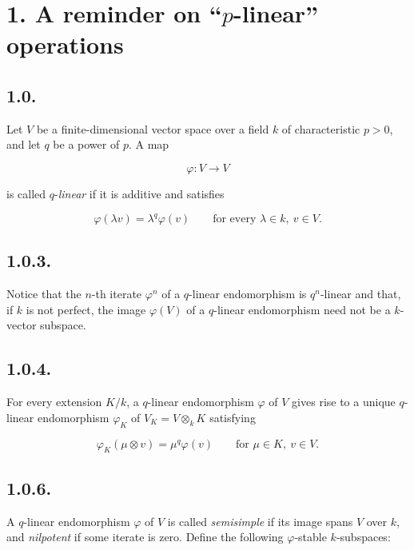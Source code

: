 \section*{1. A reminder on ``$p$-linear'' operations}

\subsection*{1.0.}
Let $V$ be a finite-dimensional vector space over a field $k$ of
characteristic $p>0$, and let $q$ be a power of $p$. A map

\begin{equation}\tag{1.0.1}
\varphi:V\longrightarrow V
\end{equation}

is called $q$-\emph{linear} if it is additive and satisfies

\begin{equation}\tag{1.0.2}
\varphi(\lambda v)=\lambda^q\varphi(v)
\qquad\text{for every }\lambda\in k,\ v\in V.
\end{equation}

\subsection*{1.0.3.}
Notice that the $n$-th iterate $\varphi^n$ of a $q$-linear endomorphism is
$q^n$-linear and that, if $k$ is not perfect, the image $\varphi(V)$ of a
$q$-linear endomorphism need not be a $k$-vector subspace.

\subsection*{1.0.4.}
For every extension $K/k$, a $q$-linear endomorphism $\varphi$ of $V$ gives
rise to a unique $q$-linear endomorphism $\varphi_K$ of
$V_K=V\otimes_kK$ satisfying

\begin{equation}\tag{1.0.5}
\varphi_K(\mu\otimes v)=\mu^q\varphi(v)
\qquad\text{for }\mu\in K,\ v\in V.
\end{equation}

\subsection*{1.0.6.}
A $q$-linear endomorphism $\varphi$ of $V$ is called \emph{semisimple} if
its image spans $V$ over $k$, and \emph{nilpotent} if some iterate is zero.
Define the following $\varphi$-stable $k$-subspaces:

